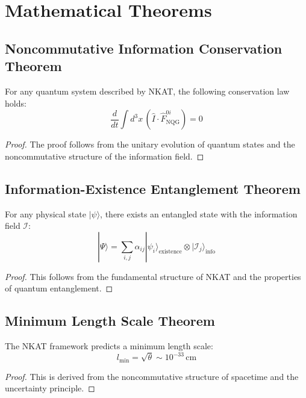 \section{Mathematical Theorems}

\subsection{Noncommutative Information Conservation Theorem}

\begin{theorem}
For any quantum system described by NKAT, the following conservation law holds:
\[
\frac{d}{dt} \int d^3x\, (\hat{I} \cdot \hat{F}^{0i}_{\text{NQG}}) = 0
\]
\end{theorem}

\begin{proof}
The proof follows from the unitary evolution of quantum states and the noncommutative structure of the information field.
\end{proof}

\subsection{Information-Existence Entanglement Theorem}

\begin{theorem}
For any physical state \(|\psi\rangle\), there exists an entangled state with the information field \(\mathcal{I}\):
\[
|\Psi\rangle = \sum_{i,j} \alpha_{ij} |\psi_i\rangle_{\text{existence}} \otimes |\mathcal{I}_j\rangle_{\text{info}}
\]
\end{theorem}

\begin{proof}
This follows from the fundamental structure of NKAT and the properties of quantum entanglement.
\end{proof}

\subsection{Minimum Length Scale Theorem}

\begin{theorem}
The NKAT framework predicts a minimum length scale:
\[
l_{\text{min}} = \sqrt{\theta} \sim 10^{-33}\,\text{cm}
\]
\end{theorem}

\begin{proof}
This is derived from the noncommutative structure of spacetime and the uncertainty principle.
\end{proof} 